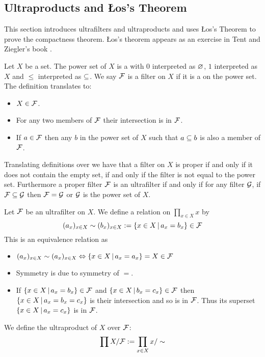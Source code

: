 \subsection{Ultraproducts and Łos's Theorem}
This section introduces ultrafilters and ultraproducts and uses Łos's Theorem
to prove the compactness theorem.
Łos's theorem appears as an exercise in Tent and Ziegler's book \cite{tent}.

\begin{dfn}
    Let $X$ be a set. 
    The power set of $X$ is a  
    with $0$ interpreted as 
    $\varnothing$, 
    $1$ interpreted as $X$ and $\leq$ interpreted as $\subseteq$.
    We say $\mathcal{F}$ is a filter on $X$ if it is a 
     on the power set.
    The definition translates to:
    \begin{itemize}
        \item $X \in \mathcal{F}$.
        \item For any two members of $\mathcal{F}$ their intersection is in $\mathcal{F}$.
        \item If $a \in \mathcal{F}$ then any $b$ in the power set of $X$ 
            such that $a \subseteq b$ is also a member of $\mathcal{F}$.
    \end{itemize}
    Translating definitions over we have that 
    a filter on $X$ is proper if and only if it does not contain the empty set,
    if and only if the filter is not equal to the power set.
    Furthermore a proper filter $\mathcal{F}$ is an ultrafilter if and only if
    for any filter $\mathcal{G}$, 
    if $\mathcal{F} \subseteq \mathcal{G}$ then $\mathcal{F} = \mathcal{G}$ 
    or $\mathcal{G}$ is the power set of $X$.
\end{dfn}

\begin{dfn}[Ultraproduct]
    Let $\mathcal{F}$ be an ultrafilter on $X$.
    We define a relation on $\prod_{x \in X} x$ by 
    \[
        (a_x)_{x \in X} \sim (b_x)_{x \in X} 
        := \left\{x \in X \,|\, a_x = b_x\right\} \in \mathcal{F}
    \]
    This is an equivalence relation as 
    \begin{itemize}
        \item $(a_x)_{x \in X} \sim (a_x)_{x \in X} \Leftrightarrow 
            \left\{x \in X \,|\, a_x = a_x\right\} = X \in \mathcal{F}$ 
        \item Symmetry is due to symmetry of $=$.
        \item If $\left\{x \in X \,|\, a_x = b_x\right\} \in \mathcal{F}$ and 
            $\left\{x \in X \,|\, b_x = c_x\right\} \in \mathcal{F}$ then 
            $\left\{x \in X \,|\, a_x = b_x = c_x\right\}$ is their intersection
            and so is in $\mathcal{F}$.
            Thus its superset $\left\{x \in X \,|\, a_x = c_x\right\}$ is in $\mathcal{F}$.
    \end{itemize}
    We define the ultraproduct of $X$ over $\mathcal{F}$:
    \[\prod X / \mathcal{F} := \prod_{x \in X} x / \sim\]
\end{dfn}


